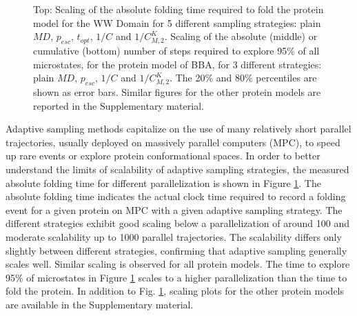 \begin{figure}[t]
\begin{subfigure}[t]{0.5\textwidth}
  \end{subfigure}
  \caption{Top: Scaling of the absolute folding time required to fold the
  protein model for the WW Domain for 5 different sampling strategies: plain
  $MD$, $p_{esc}$, $t_{opt}$, $1/C$ and $1/C_{M,2}^K$. Scaling of the
  absolute (middle) or cumulative (bottom) number of steps required to explore
  95\% of all microstates, for the protein  model of BBA, for 3 different
  strategies: plain $MD$, $p_{esc}$, $1/C$ and $1/C_{M,2}^K$.  
  The 20\% and 80\% percentiles are shown as error bars. 
  Similar figures for the other
  protein models are reported in the Supplementary material.}
  \label{fig:scaling}
\end{figure}

Adaptive sampling methods capitalize on the use of many relatively short
parallel trajectories, usually deployed on massively parallel computers (MPC),
to speed up rare events or explore protein conformational spaces. In order to
better understand the limits of scalability of adaptive sampling strategies,
the measured absolute folding time for different parallelization is shown in
Figure \ref{fig:scaling}. The absolute folding time indicates the actual clock
time required to record a folding event for a given protein on MPC with a given
adaptive sampling strategy. The different strategies exhibit good scaling below
a parallelization of around 100 and moderate scalability up to 1000 parallel
trajectories. The scalability differs only slightly between different
strategies, confirming that adaptive sampling generally scales well.
Similar scaling is observed for all protein models. The time to explore 95\% of
microstates in Figure \ref{fig:scaling} scales to a higher parallelization than
the time to fold the protein. In addition to Fig.
\ref{fig:scaling}, scaling plots for the other protein models are
available in the Supplementary material. 

